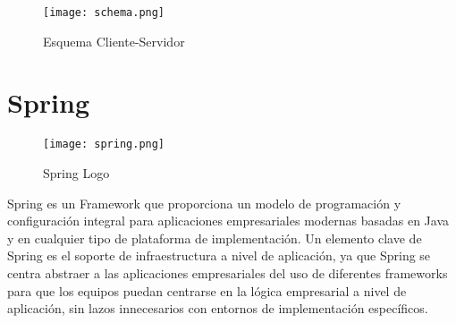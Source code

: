  			
	 			\begin{figure}[H]
	 				\centering
	 				\texttt{[image: schema.png]}
	 				\caption{Esquema Cliente-Servidor}\label{fig:schema}
	 			\end{figure}
 			
	
	
	\section{Spring}
	
		\begin{figure}[H]
			\centering
			\texttt{[image: spring.png]}
			\caption{Spring Logo}\label{fig:spring}
		\end{figure}
		
		Spring\cite{spring} es un Framework que proporciona un modelo de programación y configuración integral para aplicaciones empresariales modernas basadas en Java y en cualquier tipo de plataforma de implementación. Un elemento clave de Spring es el soporte de infraestructura a nivel de aplicación, ya que Spring se centra abstraer a las aplicaciones empresariales del uso de diferentes frameworks para que los equipos puedan centrarse en la lógica empresarial a nivel de aplicación, sin lazos innecesarios con entornos de implementación específicos.
	
	